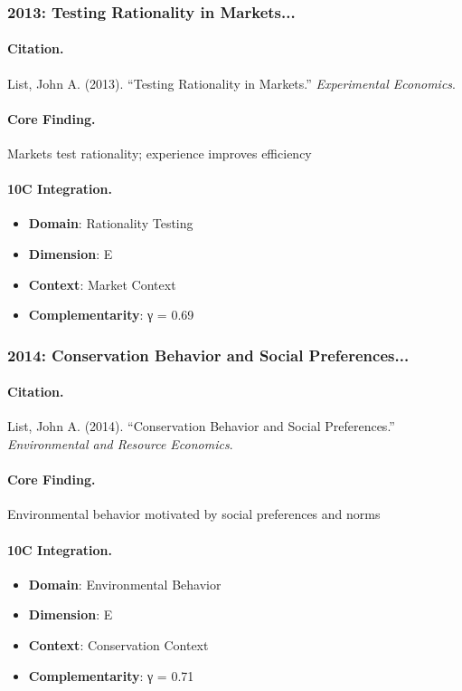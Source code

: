 \subsubsection{2013: Testing Rationality in Markets...}

\paragraph{Citation.}
List, John A. (2013). ``Testing Rationality in Markets.''
\textit{Experimental Economics}.

\paragraph{Core Finding.}
Markets test rationality; experience improves efficiency

\paragraph{10C Integration.}
\begin{itemize}[nosep]
  \item \textbf{Domain}: Rationality Testing
  \item \textbf{Dimension}: E
  \item \textbf{Context}: Market Context
  \item \textbf{Complementarity}: γ = 0.69
\end{itemize}


\subsubsection{2014: Conservation Behavior and Social Preferences...}

\paragraph{Citation.}
List, John A. (2014). ``Conservation Behavior and Social Preferences.''
\textit{Environmental and Resource Economics}.

\paragraph{Core Finding.}
Environmental behavior motivated by social preferences and norms

\paragraph{10C Integration.}
\begin{itemize}[nosep]
  \item \textbf{Domain}: Environmental Behavior
  \item \textbf{Dimension}: E
  \item \textbf{Context}: Conservation Context
  \item \textbf{Complementarity}: γ = 0.71
\end{itemize}


